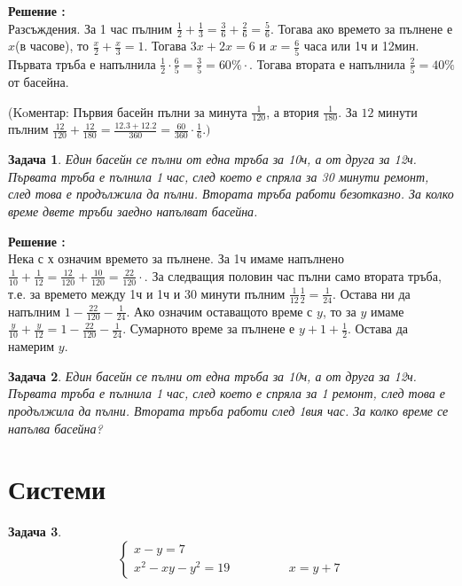 \documentclass{article}
\newtheorem{problem}{Задача}
\newcounter{solution}
\newcommand\solution{%
	\stepcounter{solution}%
	\textbf{Решение :}\\%
}
\begin{document}
\solution
Разсъждения. За 1 час пълним $\frac{1}{2} + \frac{1}{3} = \frac{3}{6} + \frac{2}{6} = \frac{5}{6}$. Тогава ако времето за пълнене е $x$(в часове), то $\frac{x}{2} + \frac{x}{3} = 1 $. Тогава $3x + 2x = 6 $ и  $ x = \frac{6}{5}$ часа или 1ч и 12мин. Първата тръба е напълнила $\frac{1}{2}\cdot \frac{6}{5} = \frac{3}{5} = 60\% \cdot $. Тогава втората е напълнила $\frac{2}{5} = 40\%$ от басейна.
 
(Koментар: Първия басейн пълни за минута $\frac{1}{120}$, а втория $\frac{1}{180}.$ За $12$ минути пълним $\frac{12}{120} + \frac{12}{180} = \frac{12.3 + 12.2}{360} = \frac{60}{360} \cdot \frac{1}{6}. )$


\begin{problem}
	Един басейн се пълни от една тръба за 10ч, а от друга за 12ч. Първата тръба е пълнила 1 час, след което е спряла за 30 минути ремонт, след това е продължила да пълни. Втората тръба работи безотказно. За колко време двете тръби заедно напълват басейна.
\end{problem}
\solution 
 Нека с х означим времето за пълнене. За 1ч имаме напълнено $\frac{1}{10} + \frac{1}{12} = \frac{12}{120} + \frac{10}{120} = \frac{22}{120} \cdot$. За следващия половин час пълни само втората тръба, т.е. за времето между 1ч и 1ч и 30 минути пълним $\frac{1}{12} \frac{1}{2} = \frac{1}{24}.$ Остава ни да напълним $1 - \frac{22}{120} - \frac{1}{24}.$ Ако означим оставащото време с $y$, то за $y$ имаме $ \frac{y}{10} + \frac{y}{12} =  1 - \frac{22}{120} - \frac{1}{24}$. Сумарното време за пълнене е $y+1+\frac{1}{2}$. Остава да намерим $y$.



\begin{problem}
	Един басейн се пълни от една тръба за 10ч, а от друга за 12ч. Първата тръба е пълнила 1 час, след което е спряла за 1 ремонт, след това е продължила да пълни. Втората тръба работи след 1вия час. За колко време се напълва басейна?
\end{problem}




\section{Системи}

\begin{problem}
	\[
	\begin{cases}
	x - y = 7 \\
	x^2 - xy - y^2=19 \hspace{2cm} x = y + 7 
	\end{cases}
	\]
\end{problem}
\end{document}
